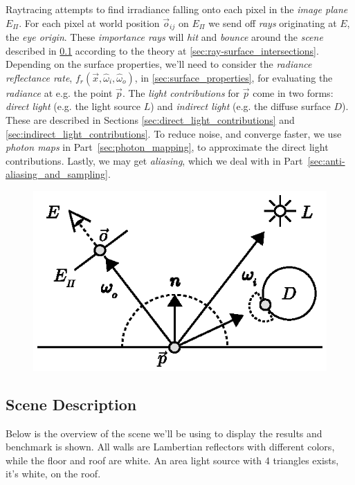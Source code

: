\documentclass[a4paper, twocolumn]{article}
\begin{document}
        Raytracing attempts to find irradiance falling onto each pixel in the \emph{image plane} \(E_\Pi\). For each pixel at world position \(\vec{o}_{ij}\) on \(E_\Pi\) we send off \emph{rays} originating at \(E\), the \emph{eye origin}. These \emph{importance rays} will \emph{hit} and \emph{bounce} around the \emph{scene} described in \cref{sec:scene_description} according to the theory at \cref{sec:ray-surface_intersections}. Depending on the surface properties, we'll need to consider the \emph{radiance reflectance rate}, \(f_r(\vec{x}, \hat{\omega}_i, \hat{\omega}_o)\), in \cref{sec:surface_properties}, for evaluating the \emph{radiance} at e.g. the point \(\vec{p}\). The \emph{light contributions} for \(\vec{p}\) come in two forms: \emph{direct light} (e.g. the light source \(L\)) and \emph{indirect light} (e.g. the diffuse surface \(D\)). These are described in Sections \ref{sec:direct_light_contributions} and \ref{sec:indirect_light_contributions}. To reduce noise, and converge faster, we use \emph{photon maps} in Part~\ref{sec:photon_mapping}, to approximate the direct light contributions. Lastly, we may get \emph{aliasing}, which we deal with in Part~\ref{sec:anti-aliasing_and_sampling}.

        \begin{figure}[ht]
            \centering
            \includegraphics[width=0.8\linewidth]{share/raytracing_overview.eps}
            \label{fig:raytracing_overview}
        \end{figure}

        \vspace{-1.8em}

        \subsection{Scene Description} \label{sec:scene_description}

        Below is the overview of the scene we'll be using to display the results and benchmark is shown. All walls are Lambertian reflectors with different colors, while the floor and roof are white. An area light source with 4 triangles exists, it's white, on the roof.
\end{document}

